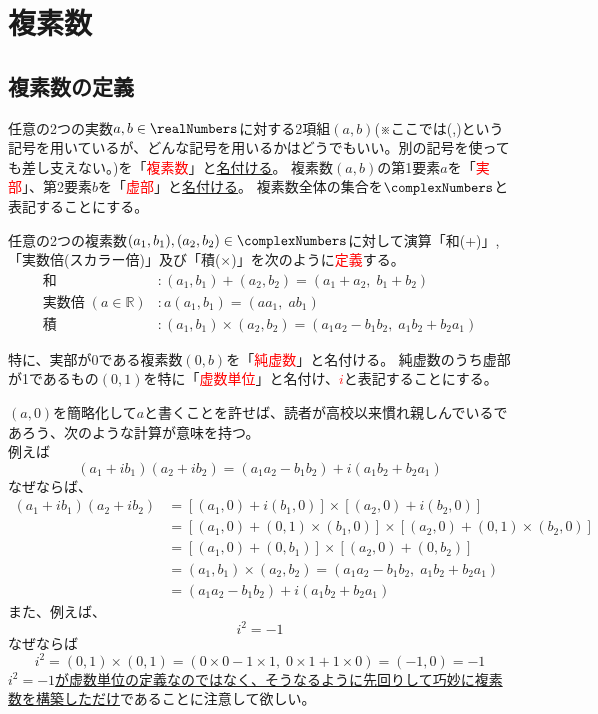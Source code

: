 \chapter{複素数}
    \section{複素数の定義}
        任意の2つの実数$a,b\in\realNumbers$に対する2項組$(a,b)$\;(※ここでは(,)という記号を用いているが、どんな記号を用いるかはどうでもいい。別の記号を使っても差し支えない。)を「\textcolor{red}{複素数}」と\underline{名付ける}。
        複素数$(a,b)$の第1要素$a$を「\textcolor{red}{実部}」、第2要素$b$を「\textcolor{red}{虚部}」と\underline{名付ける}。
        複素数全体の集合を$\complexNumbers$と表記することにする。
        \par
        任意の2つの複素数$(a_1,b_1),(a_2,b_2)\in\complexNumbers$に対して演算「和(+)」,「実数倍(スカラー倍)」及び「積($\times$)」を次のように\textcolor{red}{定義}する。
        \begin{align*}
            \textrm{和} &: (a_1,b_1)+(a_2,b_2) = (a_1+a_2,\;b_1+b_2)\\
            \textrm{実数倍}\;(a\in\mathbb{R}) &: a(a_1,b_1) = (aa_1,\;ab_1)\\
            \textrm{積} &: (a_1,b_1)\times(a_2,b_2) = (a_1a_2-b_1b_2,\;a_1b_2+b_2a_1)
        \end{align*}
        \par
        特に、実部が0である複素数$(0,b)$を「\textcolor{red}{純虚数}」と名付ける。
        純虚数のうち虚部が1であるもの$(0,1)$を特に「\textcolor{red}{虚数単位}」と名付け、\textcolor{red}{$i$}と表記することにする。\\
        \par
        $(a,0)$を簡略化して$a$と書くことを許せば、読者が高校以来慣れ親しんでいるであろう、次のような計算が意味を持つ。\\
        例えば
        \[(a_1+ib_1)(a_2+ib_2) = (a_1a_2-b_1b_2)+i(a_1b_2+b_2a_1)\]
        なぜならば、
        \begin{align*}
            (a_1+ib_1)(a_2+ib_2) &= \left[(a_1,0)+i(b_1,0)\right]\times\left[(a_2,0)+i(b_2,0)\right] \\
            &= \left[(a_1,0)+(0,1)\times(b_1,0)\right]\times\left[(a_2,0)+(0,1)\times(b_2,0)\right] \\
            &= \left[(a_1,0)+(0,b_1)\right]\times\left[(a_2,0)+(0,b_2)\right] \\
            &= (a_1,b_1)\times(a_2,b_2) = (a_1a_2-b_1b_2,\;a_1b_2+b_2a_1) \\
            &= (a_1a_2-b_1b_2)+i(a_1b_2+b_2a_1)
        \end{align*}
        また、例えば、
        \[i^2 = -1\]
        なぜならば
        \[i^2 = (0,1)\times(0,1) = (0\times0-1\times1,\;0\times1+1\times0) = (-1,0) = -1\]
        \underline{$i^2 = -1$が虚数単位の定義なのではなく、そうなるように先回りして巧妙に複素数を構築しただけ}であることに注意して欲しい。
